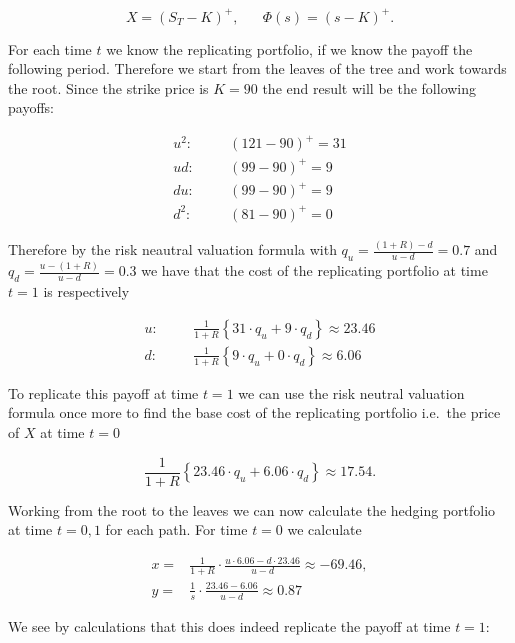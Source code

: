 \documentclass[
]{article}
\begin{document}
\[
X=(S_T-K)^+,\hspace{20pt}\Phi(s)=(s-K)^+.
\]

For each time \(t\) we know the replicating portfolio, if we know the
payoff the following period. Therefore we start from the leaves of the
tree and work towards the root. Since the strike price is \(K=90\) the
end result will be the following payoffs:

\begin{align*}
u^2:\hspace{20pt}&(121-90)^+=31\\
ud:\hspace{20pt}&(99-90)^+=9\\
du:\hspace{20pt}&(99-90)^+=9\\
d^2:\hspace{20pt}&(81-90)^+=0
\end{align*}

Therefore by the risk neautral valuation formula with
\(q_u=\frac{(1+R)-d}{u-d}=0.7\) and \(q_d=\frac{u-(1+R)}{u-d}=0.3\) we
have that the cost of the replicating portfolio at time \(t=1\) is
respectively

\begin{align*}
u:\hspace{20pt}&\frac{1}{1+R}\left\{31\cdot q_u + 9 \cdot q_d\right\}\approx 23.46\\
d:\hspace{20pt}&\frac{1}{1+R}\left\{9\cdot q_u + 0 \cdot q_d\right\}\approx 6.06
\end{align*}

To replicate this payoff at time \(t=1\) we can use the risk neutral
valuation formula once more to find the base cost of the replicating
portfolio i.e.~the price of \(X\) at time \(t=0\)

\[
\frac{1}{1+R}\left\{23.46\cdot q_u + 6.06 \cdot q_d\right\}\approx 17.54.
\]

Working from the root to the leaves we can now calculate the hedging
portfolio at time \(t=0,1\) for each path. For time \(t=0\) we calculate

\begin{align*}
x=&\frac{1}{1+R}\cdot \frac{u\cdot 6.06-d\cdot 23.46}{u-d}\approx -69.46,\\
y=&\frac{1}{s}\cdot\frac{23.46-6.06}{u-d}\approx0.87
\end{align*}

We see by calculations that this does indeed replicate the payoff at
time \(t=1\):
\end{document}
